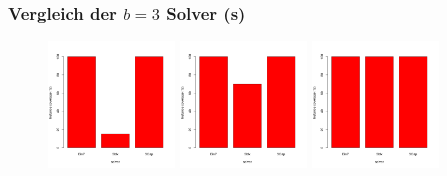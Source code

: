 \documentclass{beamer}
\begin{document}
\begin{frame}
\frametitle{Vergleich der $b = 3$ Solver (s)}

\begin{figure}
\centering
\includegraphics[width=0.3\textwidth]{images/solver_instance_coverage_b=3_small_3s.png}
\includegraphics[width=0.3\textwidth]{images/solver_instance_coverage_b=3_small_5s.png}
\includegraphics[width=0.3\textwidth]{images/solver_instance_coverage_b=3_small_10s.png}
\caption*{\textsc{Zeitlimit 3s} $\quad\quad\quad\quad$ \textsc{Zeitlimit 5s} $\quad\quad\quad\quad$ \textsc{Zeitlimit 10s}}
\begin{subfigure}[b]{0.3\textwidth}
\centering
{}
\end{subfigure}
\end{figure}
\end{frame}
\end{document}
